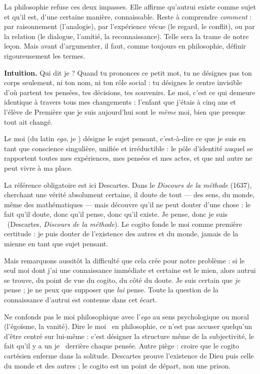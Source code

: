 \documentclass[11pt]{article}
\newcommand{\cle}[1]{{\popxbold\color{popdark}#1}}
\newcounter{popsec}
\newcounter{popsub}
\newcommand{\courssub}[1]{%
  \stepcounter{popsub}%
  \par\vspace{9pt}\noindent{\popxbold\fontsize{11.5}{13}\selectfont\color{popink}{\color{poporange}\thepopsec.\thepopsub}\hspace{6pt}#1}\par\nopagebreak\vspace{4pt}
}
\begin{document}
La philosophie refuse ces deux impasses. Elle affirme qu'autrui existe comme sujet et qu'il est, d'une certaine manière, connaissable. Reste à comprendre \emph{comment} : par raisonnement (l'analogie), par l'expérience vécue (le regard, le conflit), ou par la relation (le dialogue, l'amitié, la reconnaissance). Telle sera la trame de notre leçon. Mais avant d'argumenter, il faut, comme toujours en philosophie, définir rigoureusement les termes.

\courssub{Le moi : ce que je suis en tant que sujet}

\textbf{Intuition.} Qui dit \guillemotleft je \guillemotright ? Quand tu prononces ce petit mot, tu ne désignes pas ton corps seulement, ni ton nom, ni ton rôle social : tu désignes le centre invisible d'où partent tes pensées, tes décisions, tes souvenirs. Le moi, c'est ce qui demeure identique à travers tous mes changements : l'enfant que j'étais à cinq ans et l'élève de Première que je suis aujourd'hui sont le \emph{même} moi, bien que presque tout ait changé.

\begin{definition}[Le moi]
Le \cle{moi} (du latin \emph{ego}, \guillemotleft je \guillemotright) désigne le sujet pensant, c'est-à-dire ce que je suis en tant que conscience singulière, unifiée et irréductible : le pôle d'identité auquel se rapportent toutes mes expériences, mes pensées et mes actes, et que nul autre ne peut vivre à ma place.
\end{definition}

La référence obligatoire est ici Descartes. Dans le \emph{Discours de la méthode} (1637), cherchant une vérité absolument certaine, il doute de tout — des sens, du monde, même des mathématiques — mais découvre qu'il ne peut douter d'une chose : le fait qu'il doute, donc qu'il pense, donc qu'il existe. \guillemotleft Je pense, donc je suis \guillemotright\ (Descartes, \emph{Discours de la méthode}). Le \cle{cogito} fonde le moi comme première certitude : je puis douter de l'existence des autres et du monde, jamais de la mienne en tant que sujet pensant.

Mais remarquons aussitôt la difficulté que cela crée pour notre problème : si le seul moi dont j'ai une connaissance immédiate et certaine est le mien, alors autrui se trouve, du point de vue du cogito, du côté du doute. Je suis certain que \emph{je} pense ; je ne peux que supposer que \emph{lui} pense. Toute la question de la connaissance d'autrui est contenue dans cet écart.

\begin{attention}
Ne confonds pas le \cle{moi} philosophique avec l'\emph{ego} au sens psychologique ou moral (l'égoïsme, la vanité). Dire \guillemotleft le moi \guillemotright\ en philosophie, ce n'est pas accuser quelqu'un d'être centré sur lui-même : c'est désigner la structure même de la subjectivité, le fait qu'il y a un \guillemotleft je \guillemotright\ derrière chaque pensée. Autre piège : croire que le cogito cartésien enferme dans la solitude. Descartes prouve l'existence de Dieu puis celle du monde et des autres ; le cogito est un point de départ, non une prison.
\end{attention}
\end{document}
